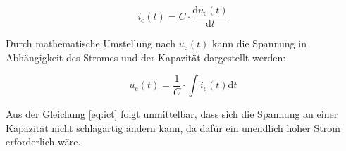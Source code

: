{\begin{equation}
	i_\mathrm{c}(t) = C \cdot \frac{\mathrm{d}u_\mathrm{c}(t)}{\mathrm{d}t} \label{eq:ict}
\end{equation}

Durch mathematische Umstellung nach $u_\mathrm{c}(t)$ kann die Spannung in Abhängigkeit des Stromes und der Kapazität dargestellt werden:

\begin{equation}
	u_\mathrm{c}(t) = \frac{1}{C} \cdot \int i_\mathrm{c}(t) \mathrm{d}t \label{eq:uci}
\end{equation}

Aus der Gleichung \ref{eq:ict} folgt unmittelbar, dass sich die Spannung an einer Kapazität nicht schlagartig ändern kann,
da dafür ein unendlich hoher Strom erforderlich wäre.

}
